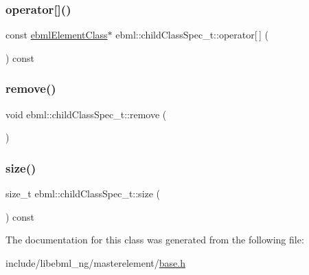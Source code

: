 \mbox{\label{classebml_1_1childClassSpec__t_abef70f82f195bd41dae3d08d956553c5}} 
\subsubsection{\texorpdfstring{operator[]()}{operator[]()}}
{\footnotesize\ttfamily const \mbox{\hyperlink{classebml_1_1ebmlElementClass}{ebml\+Element\+Class}}$\ast$ ebml\+::child\+Class\+Spec\+\_\+t\+::operator\mbox{[}$\,$\mbox{]} (\begin{DoxyParamCaption}\item[{\mbox{\hyperlink{namespaceebml_a86c5f604ddf12a74aa9812e997a58691}{ebml\+I\+D\+\_\+t}}}]{ }\end{DoxyParamCaption}) const}

\mbox{\label{classebml_1_1childClassSpec__t_a1eee1ea4974e2ad965e6020977349974}} 
\subsubsection{\texorpdfstring{remove()}{remove()}}
{\footnotesize\ttfamily void ebml\+::child\+Class\+Spec\+\_\+t\+::remove (\begin{DoxyParamCaption}\item[{\mbox{\hyperlink{namespaceebml_a86c5f604ddf12a74aa9812e997a58691}{ebml\+I\+D\+\_\+t}}}]{ }\end{DoxyParamCaption})}

\mbox{\label{classebml_1_1childClassSpec__t_a9432bd5e3ea363d4fb4ff4e1c0336f7b}} 
\subsubsection{\texorpdfstring{size()}{size()}}
{\footnotesize\ttfamily size\+\_\+t ebml\+::child\+Class\+Spec\+\_\+t\+::size (\begin{DoxyParamCaption}{ }\end{DoxyParamCaption}) const}



The documentation for this class was generated from the following file\+:\begin{DoxyCompactItemize}
\item 
include/libebml\+\_\+ng/masterelement/\mbox{\hyperlink{base_8h}{base.\+h}}\end{DoxyCompactItemize}

